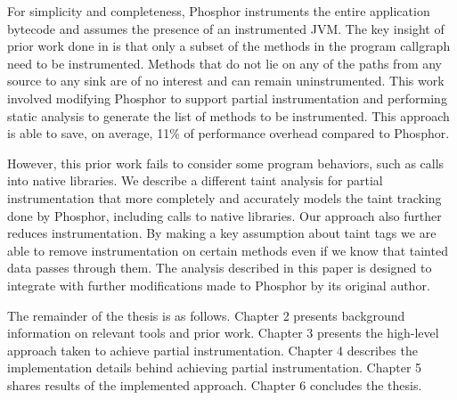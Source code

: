 For simplicity and completeness, Phosphor instruments the entire application bytecode and assumes the presence of an instrumented JVM. The key insight of prior work done in \cite{manoj_project} is that only a subset of the methods in the program callgraph need to be instrumented. Methods that do not lie on any of the paths from any source to any sink are of no interest and can remain uninstrumented. This work involved modifying Phosphor to support partial instrumentation and performing static analysis to generate the list of methods to be instrumented. This approach is able to save, on average, 11\% of performance overhead compared to Phosphor. 

However, this prior work fails to consider some program behaviors, such as calls into native libraries. We describe a different taint analysis for partial instrumentation that more completely and accurately models the taint tracking done by Phosphor, including calls to native libraries. Our approach also further reduces instrumentation. By making a key assumption about taint tags we are able to remove instrumentation on certain methods even if we know that tainted data passes through them. The analysis described in this paper is designed to integrate with further modifications made to Phosphor by its original author.

The remainder of the thesis is as follows. Chapter 2 presents background information on relevant tools and prior work. Chapter 3 presents the high-level approach taken to achieve partial instrumentation. Chapter 4 describes the implementation details behind achieving partial instrumentation. Chapter 5 shares results of the implemented approach. Chapter 6 concludes the thesis.
